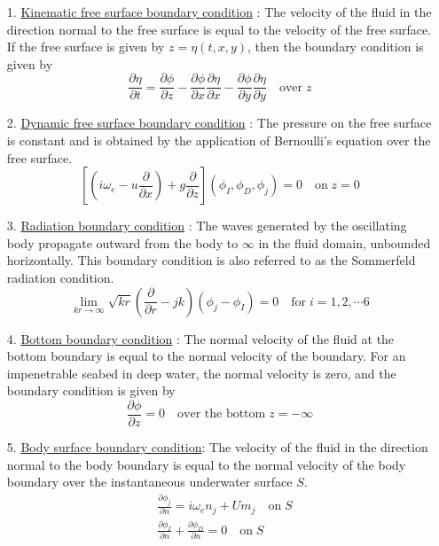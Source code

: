 \begin{itemize}
    \item[1.] \underline{Kinematic free surface boundary condition} : 
    The velocity of the fluid in the direction normal to the free surface is equal to the velocity of the free surface. If the free surface is given by $z = \eta(t, x, y)$, then the boundary condition is given by
    \begin{equation}
        \label{eq:kin_free_surface_cond}
        \frac{\partial \eta}{\partial t} = \frac{\partial \phi}{\partial z} - \frac{\partial \phi}{\partial x} \frac{\partial \eta}{\partial x} - \frac{\partial \phi}{\partial y}\frac{\partial \eta}{\partial y} \quad \text{over} \; z
    \end{equation}
    
    \item[2.] \underline{Dynamic free surface boundary condition} : 
    The pressure on the free surface is constant and is obtained by the application of Bernoulli's 
    equation over the free surface.
    \begin{equation}
        \label{eq:dyn_free_surface_cond}
        \left[\left(i\omega_e - u\frac{\partial}{\partial x}\right) + g\frac{\partial}{\partial z}\right](\phi_I, \phi_D, \phi_j) = 0 \quad \text{on} \; z = 0
    \end{equation}
    
    \item[3.] \underline{Radiation boundary condition} :
    The waves generated by the oscillating body propagate outward from the body to $\infty$ in the fluid domain, unbounded horizontally. This boundary condition is also referred to as the Sommerfeld radiation condition.
    \begin{equation}
        \label{eq:sommerfel_rad_cond}
        \lim_{kr\rightarrow \infty}\sqrt{kr}\left(\frac{\partial}{\partial r} -jk\right)(\phi_j - \phi_I) = 0 \quad \text{for}\; i = 1, 2, \cdots 6
    \end{equation}
    
    \item[4.] \underline{Bottom boundary condition} :
    The normal velocity of the fluid at the bottom boundary is equal to the normal velocity of the boundary. For an impenetrable seabed in deep water, the normal velocity is zero, and the boundary condition is given by 
    \begin{equation}
        \frac{\partial \phi}{\partial z} = 0 \quad \text{over the bottom}\; z = -\infty
    \end{equation}
    \item[5.] \underline{Body surface boundary condition}:
    The velocity of the fluid in the direction normal to the body boundary is equal to the normal velocity of the body boundary over the instantaneous underwater surface $S$.
    \begin{align}
        \label{eq:body_surface_boundary_cond}
        &\frac{\partial \phi_j}{\partial n} = i\omega_e n_j + Um_j \quad \text{on}\; S \\
        \label{eq:radiation_boundary}
        &\frac{\partial \phi_I}{\partial n} + \frac{\partial \phi_D}{\partial n} = 0 \quad \text{on}\; S
    \end{align}
\end{itemize}
